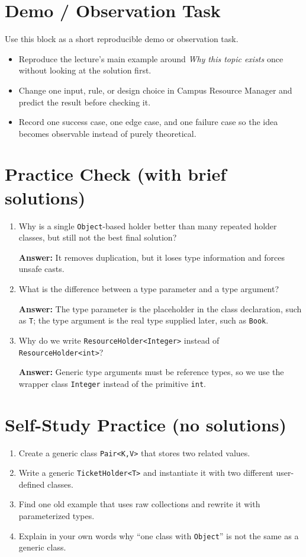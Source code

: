 \documentclass[11pt]{article}
\begin{document}
\section{Demo / Observation Task}
Use this block as a short reproducible demo or observation task.
\begin{itemize}
  \item Reproduce the lecture's main example around \textit{Why this topic exists} once without looking at the solution first.
  \item Change one input, rule, or design choice in Campus Resource Manager and predict the result before checking it.
  \item Record one success case, one edge case, and one failure case so the idea becomes observable instead of purely theoretical.
\end{itemize}
\notesources{\OOPSUnitIVSources}

\section{Practice Check (with brief solutions)}
\begin{enumerate}
  \item Why is a single \texttt{Object}-based holder better than many repeated holder classes, but still not the best final solution?\par
  \textbf{Answer:} It removes duplication, but it loses type information and forces unsafe casts.

  \item What is the difference between a type parameter and a type argument?\par
  \textbf{Answer:} The type parameter is the placeholder in the class declaration, such as \texttt{T}; the type argument is the real type supplied later, such as \texttt{Book}.

  \item Why do we write \texttt{ResourceHolder<Integer>} instead of \texttt{ResourceHolder<int>}?\par
  \textbf{Answer:} Generic type arguments must be reference types, so we use the wrapper class \texttt{Integer} instead of the primitive \texttt{int}.
\end{enumerate}

\section{Self-Study Practice (no solutions)}
\begin{enumerate}
  \item Create a generic class \texttt{Pair<K,V>} that stores two related values.
  \item Write a generic \texttt{TicketHolder<T>} and instantiate it with two different user-defined classes.
  \item Find one old example that uses raw collections and rewrite it with parameterized types.
  \item Explain in your own words why ``one class with \texttt{Object}'' is not the same as a generic class.
\end{enumerate}
\end{document}
